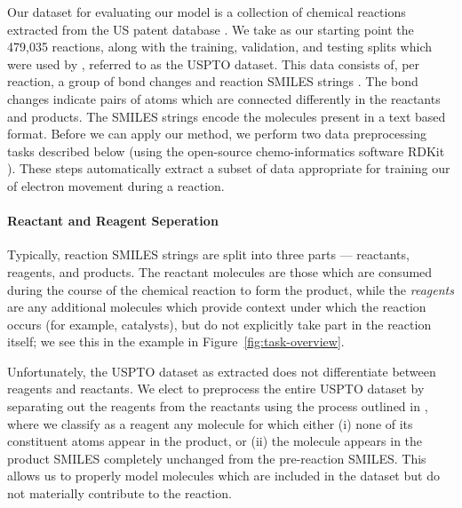 

Our dataset for evaluating our model is a collection of chemical reactions extracted from the US patent database \citep{Lowe2017}.
We take as our starting point the 479,035 reactions, along with the training, validation, and testing splits 
which were used by \citet{jin2017predicting}, referred to as the USPTO dataset.
This data consists of, per reaction, a group of bond changes and reaction SMILES strings \citep{weininger1988smiles}.
The bond changes indicate pairs of atoms which are connected differently in the reactants and products.
The SMILES strings encode the molecules present in a text based format. Before we can apply our method, we perform two data preprocessing tasks described  below (using the open-source chemo-informatics software RDKit \citep{rdkit}). 
These steps automatically extract a subset of data appropriate for training our of electron movement during a reaction.
 
\paragraph{Reactant and Reagent Seperation}
Typically, reaction SMILES strings are split into three parts --- reactants, reagents, and products.
The reactant molecules are those which are consumed during the course of the chemical reaction to form the  product, 
while the {\em reagents} are any additional molecules which provide context under which the reaction occurs (for example, catalysts),
but do not explicitly take part in the reaction itself; we see this in the example in Figure~\ref{fig:task-overview}.





Unfortunately, the USPTO dataset as extracted does not differentiate between reagents and reactants.
We elect to preprocess the entire USPTO dataset by separating out the reagents from the reactants using the process outlined in \citet{schwaller2017found}, where we classify as a reagent any molecule for which either 
(i) none of its constituent atoms appear in the product, or 
(ii) the molecule appears in the product SMILES completely unchanged from the pre-reaction SMILES.
This allows us to properly model molecules which are included in the dataset but do not materially contribute to the reaction.

